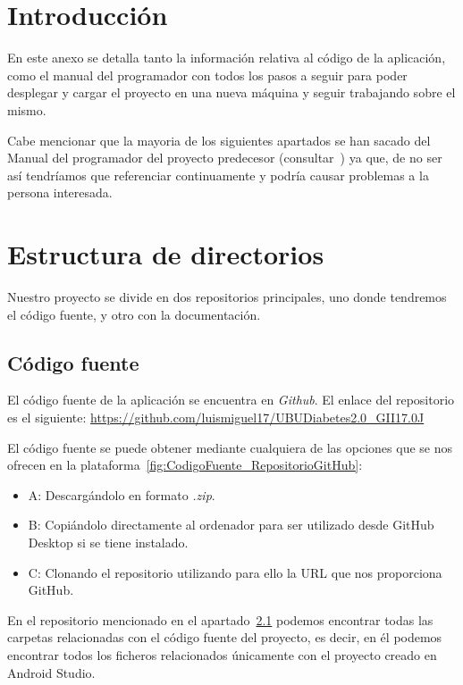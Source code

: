 
\section{Introducción}
En este anexo se detalla tanto la información relativa al código de la aplicación, como el manual del programador con todos los pasos a seguir para poder desplegar y cargar el proyecto en una nueva máquina y seguir trabajando sobre el mismo.

Cabe mencionar que la mayoria de los siguientes apartados se han sacado del Manual del programador del proyecto predecesor (consultar~\cite{mario2016}) ya que, de no ser así tendríamos que referenciar continuamente y podría causar problemas a la persona interesada.
\section{Estructura de directorios}

Nuestro proyecto se divide en dos repositorios principales, uno donde tendremos el código fuente, y otro con la documentación.
\subsection{Código fuente}\label{ssec:codigofuente}
El código fuente de la aplicación se encuentra en \textit{Github}. El enlace del repositorio es el siguiente:
\url{https://github.com/luismiguel17/UBUDiabetes2.0_GII17.0J}

El código fuente se puede obtener mediante cualquiera de las opciones que se nos ofrecen en la plataforma~\ref{fig:CodigoFuente_RepositorioGitHub}: 
\begin{itemize}
	\item \textcolor{RedTxt}{A}: Descargándolo en formato \textit{.zip}.
	\item \textcolor{RedTxt}{B}: Copiándolo directamente al ordenador para ser utilizado desde GitHub Desktop si se tiene instalado.
	\item \textcolor{RedTxt}{C}: Clonando el repositorio utilizando para ello la URL que nos proporciona GitHub.
\end{itemize}


En el repositorio mencionado en el apartado~\ref{ssec:codigofuente} podemos encontrar todas las carpetas relacionadas con el código fuente del proyecto, es decir, en él podemos encontrar todos los ficheros relacionados únicamente con el proyecto creado en Android Studio.
